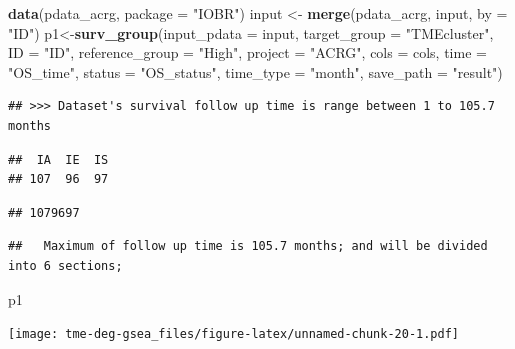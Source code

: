 \documentclass[
  12pt,
]{book}
\newenvironment{Shaded}{\begin{snugshade}}{\end{snugshade}}
\newcommand{\AttributeTok}[1]{\textcolor[rgb]{0.13,0.29,0.53}{#1}}
\newcommand{\FunctionTok}[1]{\textcolor[rgb]{0.13,0.29,0.53}{\textbf{#1}}}
\newcommand{\NormalTok}[1]{#1}
\newcommand{\OtherTok}[1]{\textcolor[rgb]{0.56,0.35,0.01}{#1}}
\newcommand{\StringTok}[1]{\textcolor[rgb]{0.31,0.60,0.02}{#1}}
\begin{document}
\begin{Shaded}
\begin{Highlighting}[]
\FunctionTok{data}\NormalTok{(pdata\_acrg, }\AttributeTok{package =} \StringTok{"IOBR"}\NormalTok{)}
\NormalTok{input }\OtherTok{\textless{}{-}} \FunctionTok{merge}\NormalTok{(pdata\_acrg, input, }\AttributeTok{by =} \StringTok{"ID"}\NormalTok{)}
\NormalTok{p1}\OtherTok{\textless{}{-}}\FunctionTok{surv\_group}\NormalTok{(}\AttributeTok{input\_pdata       =}\NormalTok{ input,}
               \AttributeTok{target\_group      =} \StringTok{"TMEcluster"}\NormalTok{,}
               \AttributeTok{ID                =} \StringTok{"ID"}\NormalTok{,}
               \AttributeTok{reference\_group   =} \StringTok{"High"}\NormalTok{,}
               \AttributeTok{project           =} \StringTok{"ACRG"}\NormalTok{,}
               \AttributeTok{cols              =}\NormalTok{ cols, }
               \AttributeTok{time              =} \StringTok{"OS\_time"}\NormalTok{,}
               \AttributeTok{status            =} \StringTok{"OS\_status"}\NormalTok{,}
               \AttributeTok{time\_type         =} \StringTok{"month"}\NormalTok{,}
               \AttributeTok{save\_path         =} \StringTok{"result"}\NormalTok{)}
\end{Highlighting}
\end{Shaded}

\begin{verbatim}
## >>> Dataset's survival follow up time is range between 1 to 105.7 months
\end{verbatim}

\begin{verbatim}
##  IA  IE  IS 
## 107  96  97
\end{verbatim}

\begin{verbatim}
## 1079697
\end{verbatim}

\begin{verbatim}
##   Maximum of follow up time is 105.7 months; and will be divided into 6 sections;
\end{verbatim}

\begin{Shaded}
\begin{Highlighting}[]
\NormalTok{p1}
\end{Highlighting}
\end{Shaded}

\texttt{[image: tme-deg-gsea\_files/figure-latex/unnamed-chunk-20-1.pdf]}
\end{document}
